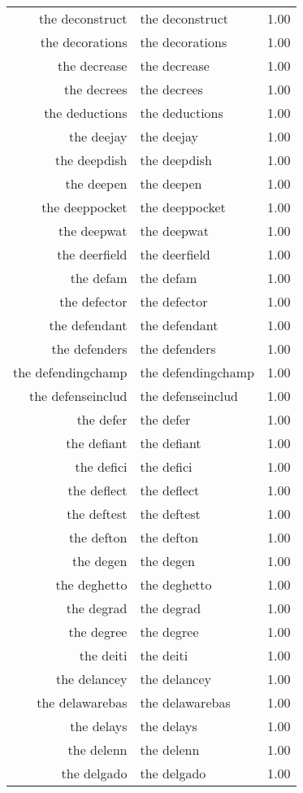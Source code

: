 \begin{table}[ht]
\begin{tabular}{rlr}
  the deconstruct & the deconstruct & 1.00 \\ 
  the decorations & the decorations & 1.00 \\ 
  the decrease & the decrease & 1.00 \\ 
  the decrees & the decrees & 1.00 \\ 
  the deductions & the deductions & 1.00 \\ 
  the deejay & the deejay & 1.00 \\ 
  the deepdish & the deepdish & 1.00 \\ 
  the deepen & the deepen & 1.00 \\ 
  the deeppocket & the deeppocket & 1.00 \\ 
  the deepwat & the deepwat & 1.00 \\ 
  the deerfield & the deerfield & 1.00 \\ 
  the defam & the defam & 1.00 \\ 
  the defector & the defector & 1.00 \\ 
  the defendant & the defendant & 1.00 \\ 
  the defenders & the defenders & 1.00 \\ 
  the defendingchamp & the defendingchamp & 1.00 \\ 
  the defenseinclud & the defenseinclud & 1.00 \\ 
  the defer & the defer & 1.00 \\ 
  the defiant & the defiant & 1.00 \\ 
  the defici & the defici & 1.00 \\ 
  the deflect & the deflect & 1.00 \\ 
  the deftest & the deftest & 1.00 \\ 
  the defton & the defton & 1.00 \\ 
  the degen & the degen & 1.00 \\ 
  the deghetto & the deghetto & 1.00 \\ 
  the degrad & the degrad & 1.00 \\ 
  the degree & the degree & 1.00 \\ 
  the deiti & the deiti & 1.00 \\ 
  the delancey & the delancey & 1.00 \\ 
  the delawarebas & the delawarebas & 1.00 \\ 
  the delays & the delays & 1.00 \\ 
  the delenn & the delenn & 1.00 \\ 
  the delgado & the delgado & 1.00 \\ 

\end{tabular}
\end{table}
